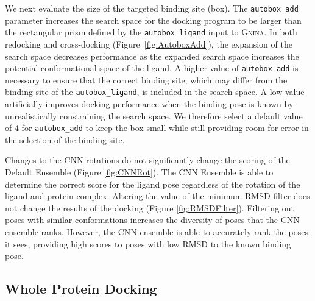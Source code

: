 \documentclass[journal=jcisd8,manuscript=article]{achemso}
\begin{document}
We next evaluate the size of the targeted binding site (box). The \texttt{autobox\_add} parameter increases the search space for the docking program to be larger than the rectangular prism defined by the \texttt{autobox\_ligand} input to \textsc{Gnina}. In both redocking and cross-docking (Figure~\ref{fig:AutoboxAdd}), the expansion of the search space decreases performance as the expanded search space increases the potential conformational space of the ligand. A higher value of \texttt{autobox\_add} is necessary to ensure that the correct binding site, which may differ from the binding site of the \texttt{autobox\_ligand}, is included in the search space. A low value artificially improves docking performance when the binding pose is known by unrealistically constraining the search space. We therefore select a default value of 4 for \texttt{autobox\_add} to keep the box small while still providing room for error in the selection of the binding site.

Changes to the CNN rotations do not significantly change the scoring of the Default Ensemble (Figure \ref{fig:CNNRot}). The CNN Ensemble is able to determine the correct score for the ligand pose regardless of the rotation of the ligand and protein complex. Altering the value of the minimum RMSD filter does not change the results of the docking (Figure \ref{fig:RMSDFilter}).  Filtering out poses with similar conformations increases the diversity of poses that the CNN ensemble ranks. However, the CNN ensemble is able to accurately rank the poses it sees, providing high scores to poses with low RMSD to the known binding pose.

\subsection{Whole Protein Docking}
\end{document}

